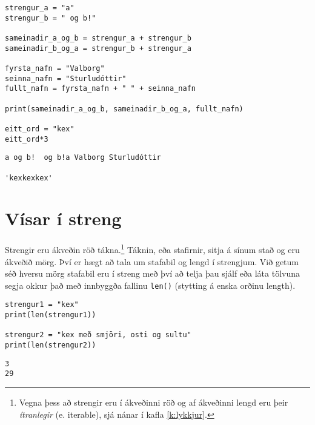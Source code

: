 \begin{lstlisting}[caption=Samskeyting og lenging strengja, label=lst:str-conmul]
strengur_a = "a"
strengur_b = " og b!"

sameinadir_a_og_b = strengur_a + strengur_b
sameinadir_b_og_a = strengur_b + strengur_a

fyrsta_nafn = "Valborg"
seinna_nafn = "Sturludóttir"
fullt_nafn = fyrsta_nafn + " " + seinna_nafn

print(sameinadir_a_og_b, sameinadir_b_og_a, fullt_nafn)

eitt_ord = "kex"
eitt_ord*3
\end{lstlisting}
\lstset{style=uttak}
\begin{lstlisting}
a og b!  og b!a Valborg Sturludóttir

'kexkexkex'
\end{lstlisting}
\lstset{style=venjulegt}

\section{Vísar í streng}
Strengir eru ákveðin röð tákna.\footnote{Vegna þess að strengir eru í ákveðinni röð og af ákveðinni lengd eru þeir \emph{ítranlegir} (e. iterable), sjá nánar í kafla \ref{k:lykkjur}.}
Táknin, eða stafirnir, sitja á sínum stað og eru ákveðið mörg.
Því er hægt að tala um stafabil og lengd í strengjum.
Við getum séð hversu mörg stafabil eru í streng með því að telja þau sjálf eða láta tölvuna segja okkur það með innbyggða fallinu \texttt{len()} (stytting á enska orðinu length).

\begin{lstlisting}[caption=Stafabilafjöldi, label=lst:str-stafabil]
strengur1 = "kex"
print(len(strengur1))

strengur2 = "kex með smjöri, osti og sultu"
print(len(strengur2))
\end{lstlisting}
\lstset{style=uttak}
\begin{lstlisting}
3
29
\end{lstlisting}
\lstset{style=venjulegt}

